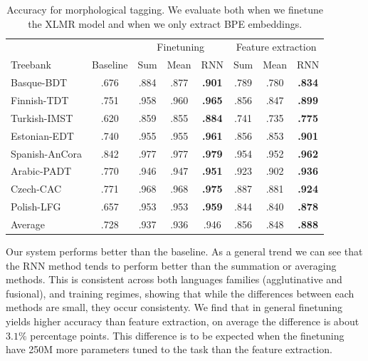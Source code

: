 \documentclass[11pt]{article}
\begin{document}
    \begin{table}%
	\centering
	\begin{tabular}{l|c|ccc|ccc}
		& & \multicolumn{3}{c}{Finetuning} & \multicolumn{3}{c}{Feature extraction} \\
		Treebank & Baseline & Sum & Mean & RNN & Sum & Mean & RNN \\
		\hline
		Basque-BDT      & .676 & .884 & .877 & \textbf{.901} & .789 & .780 & \textbf{.834} \\
		Finnish-TDT     & .751 & .958 & .960 & \textbf{.965} & .856 & .847 & \textbf{.899} \\
		Turkish-IMST    & .620 & .859 & .855 & \textbf{.884} & .741 & .735 & \textbf{.775} \\
		Estonian-EDT    & .740 & .955 & .955 & \textbf{.961} & .856 & .853 & \textbf{.901} \\
		Spanish-AnCora  & .842 & .977 & .977 & \textbf{.979} & .954 & .952 & \textbf{.962} \\
		Arabic-PADT     & .770 & .946 & .947 & \textbf{.951} & .923 & .902 & \textbf{.936} \\
		Czech-CAC       & .771 & .968 & .968 & \textbf{.975} & .887 & .881 & \textbf{.924} \\
		Polish-LFG      & .657 & .953 & .953 & \textbf{.959} & .844 & .840 & \textbf{.878} \\
        \hline
        Average         & .728 & .937 & .936 & .946  & .856 & .848 & \textbf{.888} \\
	\end{tabular}
    	\caption{\label{tab:results_tokens} Accuracy for morphological
        tagging. We evaluate both when we finetune the XLMR model and
        when we only extract BPE embeddings.}
    \end{table}


        Our system performs better than the baseline. As a general
        trend we can see that the RNN method tends to perform better
        than the summation or averaging methods. This is consistent
        across both languages families (agglutinative and fusional),
        and training regimes, showing that while the differences between each methods are
        small, they occur consistenty.
        We find that in general finetuning yields higher accuracy than
        feature extraction, on average the difference is about $3.1\%$
        percentage points.  This difference is to be expected when the
        finetuning have 250M more parameters tuned to the task than the
        feature extraction. %
    
\end{document}
